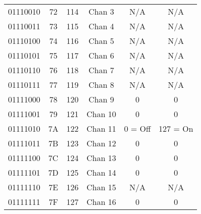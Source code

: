 \begin{center}
\begin{supertabular}{| c | c | c | c | c | c |}
             01110010 & 72 & 114 & Chan 3   & N/A & N/A \\
                01110011 & 73 & 115 & Chan 4   & N/A & N/A \\
             01110100 & 74 & 116 & Chan 5   & N/A & N/A \\
                01110101 & 75 & 117 & Chan 6   & N/A & N/A \\
             01110110 & 76 & 118 & Chan 7   & N/A & N/A \\
                01110111 & 77 & 119 & Chan 8   & N/A & N/A \\
             01111000 & 78 & 120 & Chan 9   & 0 & 0 \\
                01111001 & 79 & 121 & Chan 10  & 0 & 0 \\
             01111010 & 7A & 122 & Chan 11  & 0 = Off & 127 = On \\
                01111011 & 7B & 123 & Chan 12  & 0 & 0 \\
             01111100 & 7C & 124 & Chan 13  & 0 & 0 \\
                01111101 & 7D & 125 & Chan 14  & 0 & 0 \\
             01111110 & 7E & 126 & Chan 15  & N/A & N/A \\
                01111111 & 7F & 127 & Chan 16  & 0 & 0 \\
        \end{supertabular}
        \end{center}